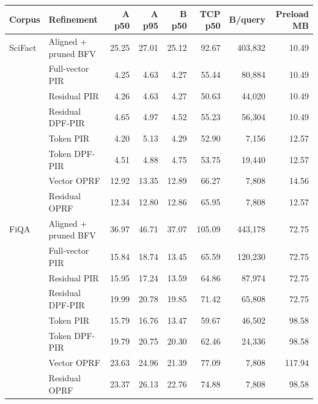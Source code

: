 \begin{tabular}{@{}llrrrrrr@{}}
\toprule
Corpus & Refinement & A p50 & A p95 & B p50 & TCP p50 & B/query & Preload MB \\
\midrule
SciFact & Aligned + pruned BFV & 25.25 & 27.01 & 25.12 & 92.67 & 403,832 & 10.49 \\
 & Full-vector PIR & 4.25 & 4.63 & 4.27 & 55.44 & 80,884 & 10.49 \\
 & Residual PIR & 4.26 & 4.63 & 4.27 & 50.63 & 44,020 & 10.49 \\
 & Residual DPF-PIR & 4.65 & 4.97 & 4.52 & 55.23 & 56,304 & 10.49 \\
 & Token PIR & 4.20 & 5.13 & 4.29 & 52.90 & 7,156 & 12.57 \\
 & Token DPF-PIR & 4.51 & 4.88 & 4.75 & 53.75 & 19,440 & 12.57 \\
 & Vector OPRF & 12.92 & 13.35 & 12.89 & 66.27 & 7,808 & 14.56 \\
 & Residual OPRF & 12.34 & 12.80 & 12.86 & 65.95 & 7,808 & 12.57 \\
FiQA & Aligned + pruned BFV & 36.97 & 46.71 & 37.07 & 105.09 & 443,178 & 72.75 \\
 & Full-vector PIR & 15.84 & 18.74 & 13.45 & 65.59 & 120,230 & 72.75 \\
 & Residual PIR & 15.95 & 17.24 & 13.59 & 64.86 & 87,974 & 72.75 \\
 & Residual DPF-PIR & 19.99 & 20.78 & 19.85 & 71.42 & 65,808 & 72.75 \\
 & Token PIR & 15.79 & 16.76 & 13.47 & 59.67 & 46,502 & 98.58 \\
 & Token DPF-PIR & 19.79 & 20.75 & 20.30 & 62.46 & 24,336 & 98.58 \\
 & Vector OPRF & 23.63 & 24.96 & 21.39 & 77.09 & 7,808 & 117.94 \\
 & Residual OPRF & 23.37 & 26.13 & 22.76 & 74.88 & 7,808 & 98.58 \\
\bottomrule
\end{tabular}
